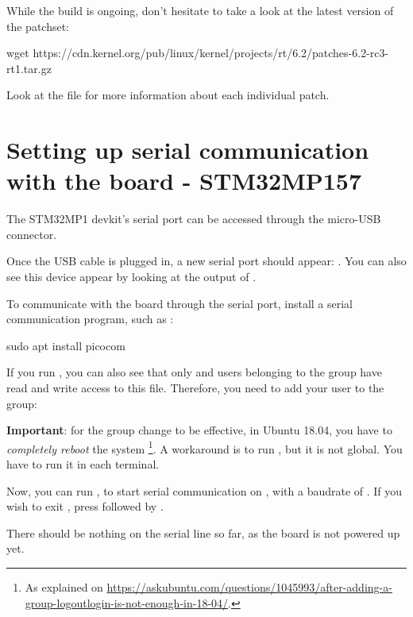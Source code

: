 While the build is ongoing, don't hesitate to take a look at the latest
version of the patchset:

\begin{bashinput}
wget https://cdn.kernel.org/pub/linux/kernel/projects/rt/6.2/patches-6.2-rc3-rt1.tar.gz
\end{bashinput}

Look at the  file for more information about each individual patch.

\section{Setting up serial communication with the board - STM32MP157}

The STM32MP1 devkit's serial port can be accessed through the micro-USB connector.

Once the USB cable is plugged in, a new serial port
should appear: .  You can also see this device
appear by looking at the output of .

To communicate with the board through the serial port, install a
serial communication program, such as :

\begin{bashinput}
sudo apt install picocom
\end{bashinput}

If you run , you can also see that only
 and users belonging to the  group have
read and write access to this file. Therefore, you need to add your user
to the  group:


{\bf Important}: for the group change to be effective, in Ubuntu 18.04, you have to
{\em completely reboot} the system \footnote{As explained on
\url{https://askubuntu.com/questions/1045993/after-adding-a-group-logoutlogin-is-not-enough-in-18-04/}.}.
A workaround is to run , but it is not global.
You have to run it in each terminal.

Now, you can run , to start serial
communication on , with a baudrate of . If
you wish to exit , press \code{[Ctrl][a]} followed by
\code{[Ctrl][x]}.

There should be nothing on the serial line so far, as the board is not
powered up yet.

